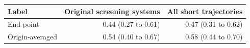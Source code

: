 \begin{tabular}{lrr}
\toprule
Label & Original screening systems & All short trajectories \\
\midrule
End-point & 0.44 (0.27 to 0.61) & 0.47 (0.31 to 0.62) \\
Origin-averaged & 0.54 (0.40 to 0.67) & 0.58 (0.44 to 0.70) \\
\bottomrule
\end{tabular}
